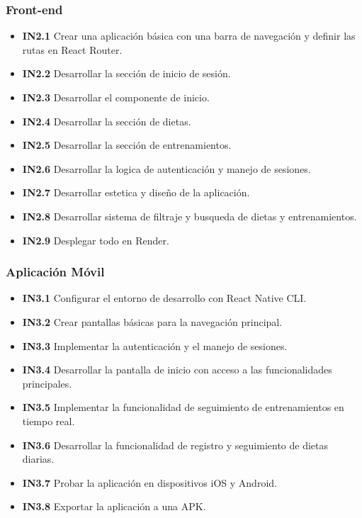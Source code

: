 \subsubsection{Front-end}
\begin{itemize}
    \item \textbf{IN2.1} Crear una aplicación básica con una barra de navegación y definir las rutas en React Router.
    \item \textbf{IN2.2} Desarrollar la sección de inicio de sesión.
    \item \textbf{IN2.3} Desarrollar el componente de inicio.
    \item \textbf{IN2.4} Desarrollar la sección de dietas.
    \item \textbf{IN2.5} Desarrollar la sección de entrenamientos.
    \item \textbf{IN2.6} Desarrollar la logica de autenticación y manejo de sesiones.
    \item \textbf{IN2.7} Desarrollar estetica y diseño de la aplicación.
    \item \textbf{IN2.8} Desarrollar sistema de filtraje y busqueda de dietas y entrenamientos.
    \item \textbf{IN2.9} Desplegar todo en Render.
\end{itemize}

\subsubsection{Aplicación Móvil}
\begin{itemize}
    \item \textbf{IN3.1} Configurar el entorno de desarrollo con React Native CLI.
    \item \textbf{IN3.2} Crear pantallas básicas para la navegación principal.
    \item \textbf{IN3.3} Implementar la autenticación y el manejo de sesiones.
    \item \textbf{IN3.4} Desarrollar la pantalla de inicio con acceso a las funcionalidades principales.
    \item \textbf{IN3.5} Implementar la funcionalidad de seguimiento de entrenamientos en tiempo real.
    \item \textbf{IN3.6} Desarrollar la funcionalidad de registro y seguimiento de dietas diarias.
    \item \textbf{IN3.7} Probar la aplicación en dispositivos iOS y Android.
    \item \textbf{IN3.8} Exportar la aplicación a una APK.
\end{itemize}